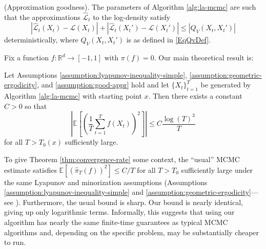 \begin{assumption} 
(Approximation goodness). The parameters of Algorithm \ref{alg:la-mcmc}  are such that the approximations $\widehat{\mathcal{L}}_{t}$ to the log-density satisfy
\begin{equation}
    \left \vert \widehat{\mathcal{L}}_{t}(X_{t}) - \mathcal{L}(X_{t}) \right \vert + \left \vert \widehat{\mathcal{L}}_{t}(X_{t}') - \mathcal{L}(X_{t}') \right \vert  \leq  \left \vert Q_{V}(X_{t}, X_{t}') \right \vert 
\end{equation}
deterministically, where $Q_{V}(X_{t}, X_{t}')$ is as defined in \eqref{EqQvDef}. 
\label{assumption:good-appr}
\end{assumption}
%
Fix a function $f : \mathbb{R}^{d} \to [-1,1]$ with $\pi(f) = 0$. Our main theoretical result is:
\begin{theorem}
Let Assumptions \ref{assumption:lyapunov-inequality-simple}, \ref{assumption:geometric-ergodicity}, and \ref{assumption:good-appr} hold and let $\{X_t\}_{t=1}^{T}$ be generated by Algorithm \ref{alg:la-mcmc} with starting point $x$. Then there exists a constant $C > 0$ so that
\begin{equation}
\left|\mathbb{E}\left[ \left( \frac{1}{T} \sum_{t=1}^{T} f(X_t) \right)^2 \right] \right| \leq C \frac{\log(T)^{3}}{T}
\end{equation}
for all $T > T_{0}(x)$ sufficiently large.
\label{thm:convergence-rate}
\end{theorem}
%
%
To give Theorem \ref{thm:convergence-rate} some context, the ``usual'' MCMC estimate satisfies $\mathbb{E}[(\hat{\pi}_{T}(f))^2] \leq C/T$ for all $T > T_{0}$ sufficiently large 
under the same Lyapunov and minorization assumptions (Assumptions \ref{assumption:lyapunov-inequality-simple} and \ref{assumption:geometric-ergodicity}---see \citet{meyn2012markov}). Furthermore, the usual bound is sharp. Our bound is nearly identical, giving up only logarithmic terms. Informally, this suggests that using our algorithm has nearly the same finite-time guarantees as typical MCMC algorithms and, depending on the specific problem, may be substantially cheaper to run.
